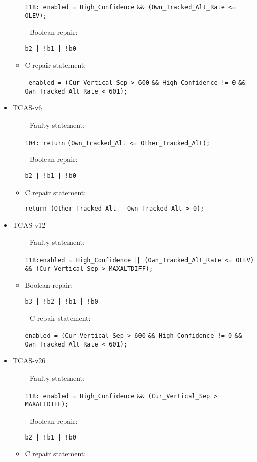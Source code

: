 \begin{itemize}
\begin{itemize}
\lstinline|118: enabled = High_Confidence| \lstinline|&& (Own_Tracked_Alt_Rate <= OLEV);|
\item[-] Boolean repair:

\lstinline{b2 | !b1 | !b0}
\item[-] C repair statement: 

\lstinline| enabled = (Cur_Vertical_Sep > 600| \lstinline|&& High_Confidence != 0| \lstinline|&& Own_Tracked_Alt_Rate < 601);|
\end{itemize}

\item TCAS-v6
\begin{itemize}
\item[-] Faulty statement:

\lstinline|104: return| \lstinline|(Own_Tracked_Alt <= Other_Tracked_Alt);|
\item[-] Boolean repair:

\lstinline{b2 | !b1 | !b0}
\item[-] C repair statement: 

\lstinline|return (Other_Tracked_Alt - Own_Tracked_Alt > 0);|
\end{itemize}

\item TCAS-v12
\begin{itemize}
\item[-] Faulty statement:

\lstinline|118:enabled = High_Confidence| \lstinline{|| (Own_Tracked_Alt_Rate <= OLEV)} \lstinline|&& (Cur_Vertical_Sep > MAXALTDIFF);|
\item[-] Boolean repair:

\lstinline{b3 | !b2 | !b1 | !b0}
\item[-] C repair statement: 

\lstinline|enabled = (Cur_Vertical_Sep > 600| \lstinline|&& High_Confidence != 0| \lstinline|&& Own_Tracked_Alt_Rate < 601);|
\end{itemize}

\item TCAS-v26
\begin{itemize}
\item[-] Faulty statement:

\lstinline|118: enabled = High_Confidence| \lstinline|&& (Cur_Vertical_Sep > MAXALTDIFF);|
\item[-] Boolean repair:

\lstinline{b2 | !b1 | !b0}
\item[-] C repair statement: 


\end{itemize}
\end{itemize}
